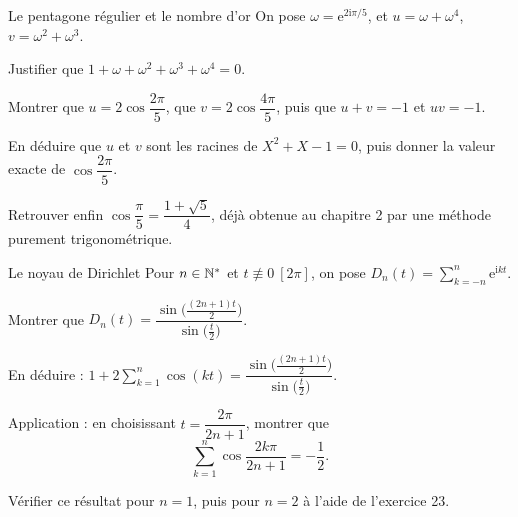 \begin{exercice}[3]{Le pentagone régulier et le nombre d'or}
On pose $\omega=\mathrm{e}^{2\mathrm{i}\pi/5}$, et
$u=\omega+\omega^{4}$, $v=\omega^{2}+\omega^{3}$.
\begin{questions}
  \item Justifier que $1+\omega+\omega^{2}+\omega^{3}+\omega^{4}=0$.
  \item Montrer que $u=2\cos\dfrac{2\pi}{5}$, que $v=2\cos\dfrac{4\pi}{5}$,
    puis que $u+v=-1$ et $uv=-1$.
  \item En déduire que $u$ et $v$ sont les racines de $X^{2}+X-1=0$, puis
    donner la valeur exacte de $\cos\dfrac{2\pi}{5}$.
  \item Retrouver enfin $\cos\dfrac{\pi}{5}=\dfrac{1+\sqrt5}{4}$, déjà
    obtenue au chapitre 2 par une méthode purement trigonométrique.
\end{questions}
\end{exercice}

\begin{exercice}[3]{Le noyau de Dirichlet}
Pour $n\in\mathbb{N}^{*}$ et $t\not\equiv0\ [2\pi]$, on pose
$D_n(t)=\displaystyle\sum_{k=-n}^{n}\mathrm{e}^{\mathrm{i}kt}$.
\begin{questions}
  \item Montrer que
    $D_n(t)=\dfrac{\sin\bigl(\frac{(2n+1)t}{2}\bigr)}{\sin\bigl(\frac{t}{2}\bigr)}$.
  \item En déduire :
    $1+2\displaystyle\sum_{k=1}^{n}\cos(kt)=\dfrac{\sin\bigl(\frac{(2n+1)t}{2}\bigr)}{\sin\bigl(\frac{t}{2}\bigr)}$.
  \item Application : en choisissant $t=\dfrac{2\pi}{2n+1}$, montrer que
    \[
      \sum_{k=1}^{n}\cos\frac{2k\pi}{2n+1}=-\frac12.
    \]
  \item Vérifier ce résultat pour $n=1$, puis pour $n=2$ à l'aide de
    l'exercice 23.
\end{questions}
\end{exercice}


